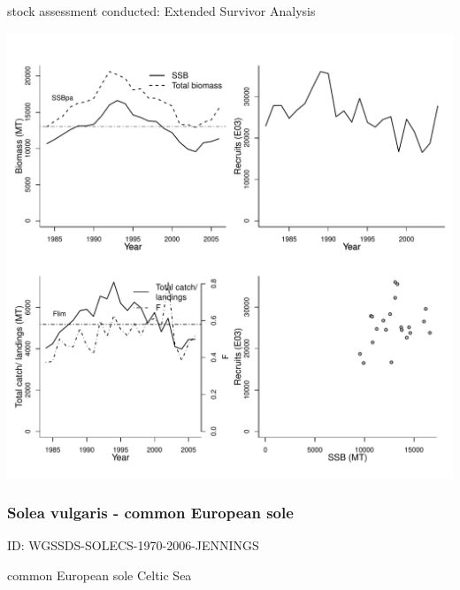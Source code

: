 stock assessment conducted: Extended Survivor Analysis 
\begin{center}
\vspace{-0.2cm}\includegraphics[scale=0.65]{../tex/figures/plot-WGHMM-SOLEVIII-1982-2006-JENNINGS.pdf}
\end{center}

\newpage
\subsubsection{Solea vulgaris - common European sole}
ID: WGSSDS-SOLECS-1970-2006-JENNINGS

common European sole Celtic Sea 

